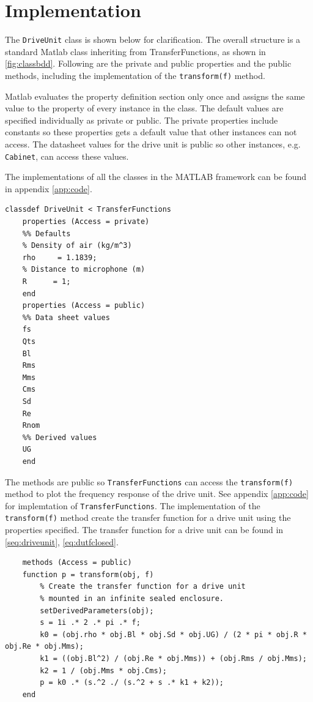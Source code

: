 \section{Implementation}
The \texttt{DriveUnit} class is shown below for clarification. 
The overall structure is a standard Matlab class inheriting from TransferFunctions, as shown in \cref{fig:classbdd}. 
Following are the private and public properties and the public methods, including the implementation of the \texttt{transform(f)} method.

Matlab evaluates the property definition section only once and assigns the same value to the property of every instance in the class. \cite{MatlabClasses}
The default values are specified individually as private or public.
The private properties include constants so these properties gets a default value that other instances can not access. 
The datasheet values for the drive unit is public so other instances, e.g. \texttt{Cabinet}, can access these values.

The implementations of all the classes in the MATLAB framework can be found in appendix \ref{app:code}. 


\begin{verbatim}
classdef DriveUnit < TransferFunctions
    properties (Access = private)
	%% Defaults
	% Density of air (kg/m^3)
	rho     = 1.1839;
	% Distance to microphone (m)
	R      = 1;
	end
    properties (Access = public)
	%% Data sheet values
	fs
	Qts
	Bl
	Rms
	Mms
	Cms
	Sd
	Re
	Rnom
	%% Derived values
	UG
    end
\end{verbatim}

The methods are public so \texttt{TransferFunctions} can access the \texttt{transform(f)} method to plot the frequency response of the drive unit. See appendix \ref{app:code} for implemtation of \texttt{TransferFunctions}.
The implementation of the \texttt{transform(f)} method create the transfer function for a drive unit using the properties specified.
The transfer function for a drive unit can be found in \cref{seq:driveunit}, \cref{eq:dutfclosed}.

\begin{verbatim}
    methods (Access = public)
	function p = transform(obj, f)
	    % Create the transfer function for a drive unit
	    % mounted in an infinite sealed enclosure.
	    setDerivedParameters(obj);
	    s = 1i .* 2 .* pi .* f;
	    k0 = (obj.rho * obj.Bl * obj.Sd * obj.UG) / (2 * pi * obj.R * obj.Re * obj.Mms);
	    k1 = ((obj.Bl^2) / (obj.Re * obj.Mms)) + (obj.Rms / obj.Mms);
	    k2 = 1 / (obj.Mms * obj.Cms);
	    p = k0 .* (s.^2 ./ (s.^2 + s .* k1 + k2));
	end
\end{verbatim}

